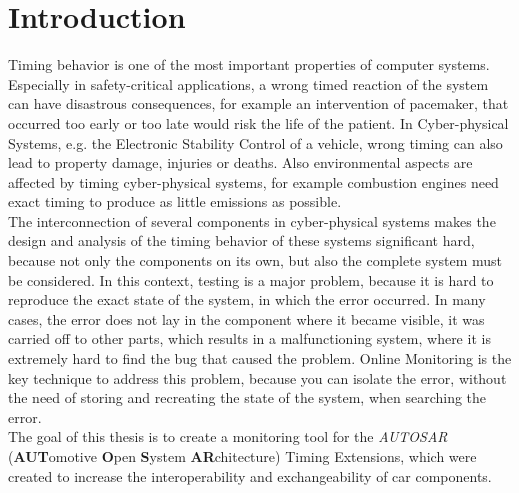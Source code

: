 
\chapter{Introduction}

Timing behavior is one of the most important properties of computer systems. Especially in safety-critical applications, a wrong timed reaction of the system can have disastrous consequences, for example an intervention of pacemaker, that occurred too early or too late would risk the life of the patient. In Cyber-physical Systems, e.g. the Electronic Stability Control of a vehicle, wrong timing can also lead to property damage, injuries or deaths. Also environmental aspects are affected by timing cyber-physical systems, for example combustion engines need exact timing to produce as little emissions as possible.\\
The interconnection of several components in cyber-physical systems makes the design and analysis of the timing behavior of these systems significant hard, because not only the components on its own, but also the complete system must be considered. In this context, testing is a major problem, because it is hard to reproduce the exact state of the system, in which the error occurred. In many cases, the error does not lay in the component where it became visible, it was carried off to other parts, which results in a malfunctioning system, where it is extremely hard to find the bug that caused the problem. Online Monitoring is the key technique to address this problem, because you can isolate the error, without the need of storing and recreating the state of the system, when searching the error.\\
The goal of this thesis is to create a monitoring tool for the \emph{AUTOSAR} (\textbf{AUT}omotive \textbf{O}pen \textbf{S}ystem \textbf{AR}chitecture) Timing Extensions, which were created to increase the interoperability and exchangeability of car components.

